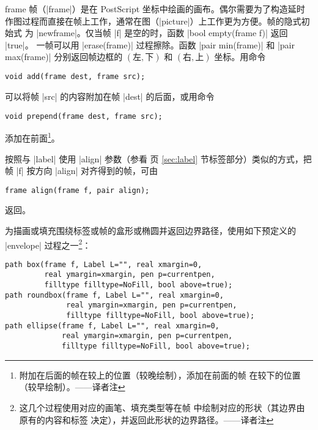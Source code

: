\documentclass[nofonts,CJKnormalspaces]{ctexbook}[2009/05/20]
\makeatletter
\newenvironment{typelist}{\itemize
  \let\old@item\@item
  \def\@item[##1]{\expandafter\old@item[\ttfamily\color{type!50!black}##1]}}
{\enditemize}
\newcommand*\prgname[1]{\textsf{#1}}
\newcommand\transnote[1]{\footnote{#1——译者注}}
\makeatother
\begin{document}
\begin{typelist}
\item[frame]
帧（|frame|）是在 \prgname{PostScript} 坐标中绘画的画布。偶尔需要为了构造延时
作图过程而直接在帧上工作，通常在图（|picture|）上工作更为方便。帧的隐式初始式
为 |newframe|。仅当帧 |f| 是空的时，函数 |bool empty(frame f)| 返回 |true|。
一帧可以用 |erase(frame)| 过程擦除。函数 |pair min(frame)| 和
|pair max(frame)| 分别返回帧边框的 $(\text{左},\text{下})$ 和 $(\text{右},
\text{上})$ 坐标。用命令
\begin{lstlisting}
void add(frame dest, frame src);
\end{lstlisting}
可以将帧 |src| 的内容附加在帧 |dest| 的后面，或用命令
\begin{lstlisting}
void prepend(frame dest, frame src);
\end{lstlisting}
添加在前面\transnote{附加在后面的帧在较上的位置（较晚绘制），添加在前面的帧
在较下的位置（较早绘制）。}。

按照与 |label| 使用 |align| 参数（参看 \pageref{sec:label} 页 \ref{sec:label}
节标签部分）类似的方式，把帧 |f| 按方向 |align| 对齐得到的帧，可由
\begin{lstlisting}
frame align(frame f, pair align);
\end{lstlisting}
返回。

为描画或填充围绕标签或帧的盒形或椭圆并返回边界路径，使用如下预定义的
|envelope| 过程之一\transnote{这几个过程使用对应的画笔、填充类型等在帧
 中绘制对应的形状（其边界由 \inlinecode{f} 原有的内容和标签
\inlinecode{L} 决定），并返回此形状的边界路径。}：
\begin{lstlisting}
path box(frame f, Label L="", real xmargin=0,
         real ymargin=xmargin, pen p=currentpen,
         filltype filltype=NoFill, bool above=true);
path roundbox(frame f, Label L="", real xmargin=0,
              real ymargin=xmargin, pen p=currentpen,
              filltype filltype=NoFill, bool above=true);
path ellipse(frame f, Label L="", real xmargin=0,
             real ymargin=xmargin, pen p=currentpen,
             filltype filltype=NoFill, bool above=true);
\end{lstlisting}


\end{typelist}
\end{document}

